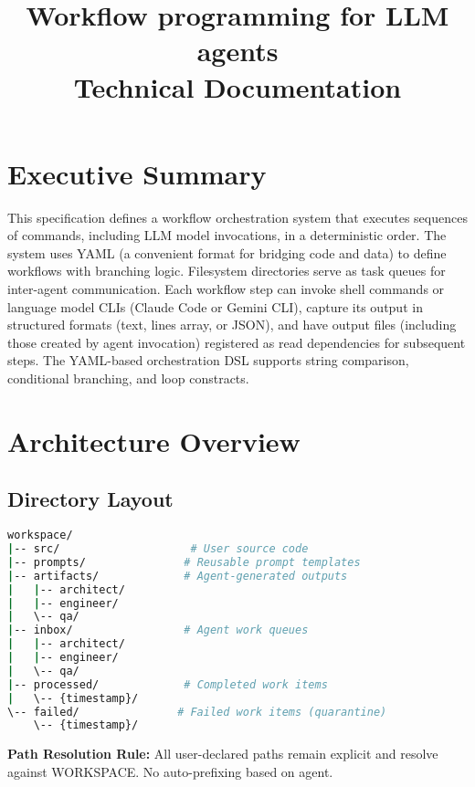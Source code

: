 \documentclass[11pt,a4paper]{article}
\title{\Huge\textbf{Workflow programming for LLM agents}\\[0.5cm]
       \Large Technical Documentation}
\author{}
\begin{document}

\newpage
\tableofcontents
\newpage

\section{Executive Summary}

This specification defines a workflow orchestration system that executes sequences of commands, including LLM model invocations, in a deterministic order. The system uses YAML (a convenient format for bridging code and data) to define workflows with branching logic. Filesystem directories serve as task queues for inter-agent communication. Each workflow step can invoke shell commands or language model CLIs (Claude Code or Gemini CLI), capture its output in structured formats (text, lines array, or JSON), and have output files (including those created by agent invocation) registered as read dependencies for subsequent steps. The YAML-based orchestration DSL supports string comparison, conditional branching, and loop constracts.

\section{Architecture Overview}

\subsection{Directory Layout}

\begin{lstlisting}[language=bash, caption={Workspace Directory Structure}]
workspace/
|-- src/                    # User source code
|-- prompts/               # Reusable prompt templates
|-- artifacts/             # Agent-generated outputs
|   |-- architect/
|   |-- engineer/
|   \-- qa/
|-- inbox/                 # Agent work queues
|   |-- architect/
|   |-- engineer/
|   \-- qa/
|-- processed/             # Completed work items
|   \-- {timestamp}/
\-- failed/               # Failed work items (quarantine)
    \-- {timestamp}/
\end{lstlisting}

\textbf{Path Resolution Rule:} All user-declared paths remain explicit and resolve against WORKSPACE. No auto-prefixing based on agent.
\end{document}
